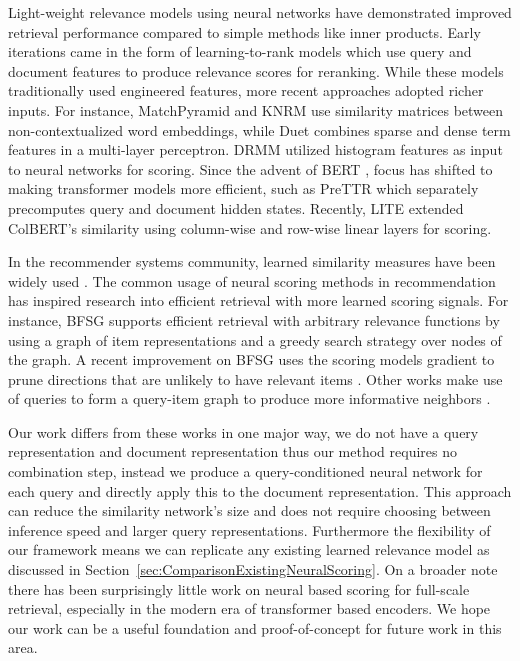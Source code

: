 \documentclass[sigconf,]{acmart}
\begin{document}
Light-weight relevance models using neural networks have demonstrated improved retrieval performance compared to simple methods like inner products. Early iterations came in the form of learning-to-rank models \cite{RankNet, LearningToRankNonSmooth} which use query and document features to produce relevance scores for reranking. While these models traditionally used engineered features, more recent approaches adopted richer inputs. For instance, MatchPyramid \cite{MatchPyramid} and KNRM \cite{KNRM} use similarity matrices between non-contextualized word embeddings, while Duet \cite{Duetv1, DuetV2} combines sparse and dense term features in a multi-layer perceptron. DRMM \cite{DRMM} utilized histogram features as input to neural networks for scoring. Since the advent of BERT \cite{BERT}, focus has shifted to making transformer models more efficient, such as PreTTR \cite{PreTTR} which separately precomputes query and document hidden states. Recently, LITE \cite{LITE} extended ColBERT's similarity using column-wise and row-wise linear layers for scoring.

In the recommender systems community, learned similarity measures have been widely used \cite{LearnedCollaborativeFiltering, NeuralFactorizationMachines}. The common usage of neural scoring methods in recommendation has inspired research into efficient retrieval with more learned scoring signals. For instance, BFSG \cite{NeuralNetworkFastItemRanking} supports efficient retrieval with arbitrary relevance functions by using a graph of item representations and a greedy search strategy over nodes of the graph. A recent improvement on BFSG uses the scoring models gradient to prune directions that are unlikely to have relevant items \cite{GradientPruningTowardFastNeuralRanking}. Other works make use of queries to form a query-item graph to produce more informative neighbors \cite{FastNeuralRankingOnBipartiteGraphIndices}.

Our work differs from these works in one major way, we do not have a query representation and document representation thus our method requires no combination step, instead we produce a query-conditioned neural network for each query and directly apply this to the document representation. This approach can reduce the similarity network's size and does not require choosing between inference speed and larger query representations. Furthermore the flexibility of our framework means we can replicate any existing learned relevance model as discussed in Section~\ref{sec:ComparisonExistingNeuralScoring}. On a broader note there has been surprisingly little work on neural based scoring for full-scale retrieval, especially in the modern era of transformer based encoders. We hope our work can be a useful foundation and proof-of-concept for future work in this area.
\end{document}
